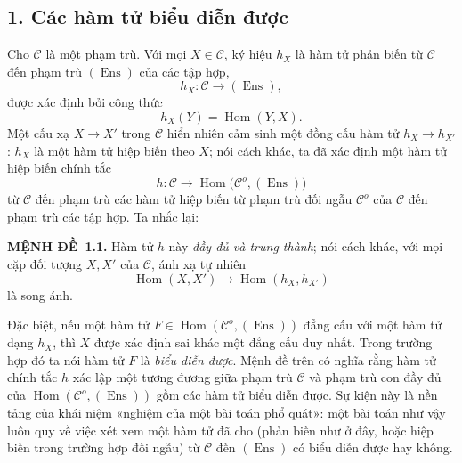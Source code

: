 \documentclass[11pt,twoside,openany]{book}
\numberwithin{equation}{section}
\newcommand{\result}[2]{\par\medskip\noindent\textbf{#1\if\relax\detokenize{#2}\relax\else\ #2\fi.}\quad}
\begin{document}
\subsection*{1. Các hàm tử biểu diễn được}

Cho $\mathcal C$ là một phạm trù. Với mọi $X\in\mathcal C$, ký hiệu $h_X$ là
hàm tử phản biến từ $\mathcal C$ đến phạm trù $(\operatorname{Ens})$ của các
tập hợp,
\[
  h_X:\mathcal C\longrightarrow(\operatorname{Ens}),
\]
được xác định bởi công thức
\[
  h_X(Y)=\operatorname{Hom}(Y,X).
\]
Một cấu xạ $X\longrightarrow X'$ trong $\mathcal C$ hiển nhiên cảm sinh một
đồng cấu hàm tử $h_X\longrightarrow h_{X'}$: $h_X$ là một hàm tử hiệp biến
theo $X$; nói cách khác, ta đã xác định một hàm tử hiệp biến chính tắc
\[
  h:\mathcal C\longrightarrow
  \operatorname{Hom}\bigl(\mathcal C^o,(\operatorname{Ens})\bigr)
\]
từ $\mathcal C$ đến phạm trù các hàm tử hiệp biến từ phạm trù đối ngẫu
$\mathcal C^o$ của $\mathcal C$ đến phạm trù các tập hợp. Ta nhắc lại:

\result{MỆNH ĐỀ}{1.1} Hàm tử $h$ này \emph{đầy đủ và trung thành}; nói cách
khác, với mọi cặp đối tượng $X,X'$ của $\mathcal C$, ánh xạ tự nhiên
\[
  \operatorname{Hom}(X,X')\longrightarrow
  \operatorname{Hom}(h_X,h_{X'})
\]
là song ánh.

Đặc biệt, nếu một hàm tử
$F\in\operatorname{Hom}(\mathcal C^o,(\operatorname{Ens}))$ đẳng cấu với một
hàm tử dạng $h_X$, thì $X$ được xác định sai khác một đẳng cấu duy nhất.
Trong trường hợp đó ta nói hàm tử $F$ là \emph{biểu diễn được}. Mệnh đề trên
có nghĩa rằng hàm tử chính tắc $h$ xác lập một tương đương giữa phạm trù
$\mathcal C$ và phạm trù con đầy đủ của
$\operatorname{Hom}(\mathcal C^o,(\operatorname{Ens}))$ gồm các hàm tử biểu
diễn được. Sự kiện này là nền tảng của khái niệm «nghiệm của một bài toán phổ
quát»: một bài toán như vậy luôn quy về việc xét xem một hàm tử đã cho
(phản biến như ở đây, hoặc hiệp biến trong trường hợp đối ngẫu) từ
$\mathcal C$ đến $(\operatorname{Ens})$ có biểu diễn được hay không.
\end{document}
